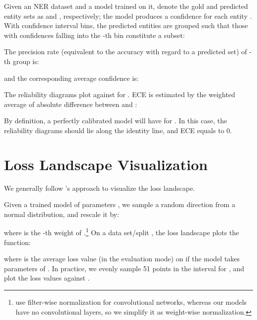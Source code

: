 \documentclass[11pt]{article}
\begin{document}
Given an NER dataset and a model trained on it, denote the gold and predicted entity sets as  and , respectively; the model produces a confidence  for each entity . With  confidence interval bins, the predicted entities are grouped such that those with confidences falling into the -th bin constitute a subset:


The precision rate (equivalent to the accuracy with regard to a predicted set) of -th group  is: 


and the corresponding average confidence is: 


The reliability diagrams plot  against  for . ECE is estimated by the weighted average of absolute difference between  and : 


By definition, a perfectly calibrated model will have  for . In this case, the reliability diagrams should lie along the identity line, and ECE equals to 0. 

\section{Loss Landscape Visualization} \label{sec:landscape}
We generally follow \citet{li2018visualizing}'s approach to visualize the loss landscape. 

Given a trained model of parameters , we sample a random direction  from a normal distribution, and rescale it by: 


where  is the -th weight of .\footnote{\citet{li2018visualizing} use filter-wise normalization for convolutional networks, whereas our models have no convolutional layers, so we simplify it as weight-wise normalization.} On a data set/split , the loss landscape plots the function: 


where  is the average loss value (in the evaluation mode) on  if the model takes parameters of . In practice, we evenly sample 51 points in the interval  for , and plot the loss values against . 
\end{document}
